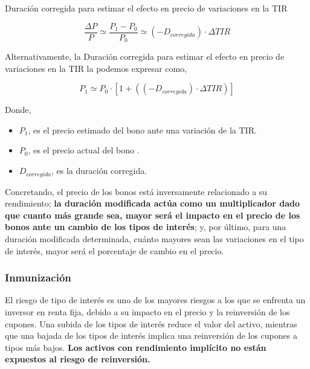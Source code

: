 \documentclass[
  letterpaper,
  DIV=11,
  numbers=noendperiod]{scrartcl}
\begin{document}
\begin{tcolorbox}[enhanced jigsaw, colframe=quarto-callout-note-color-frame, opacityback=0, colback=white, leftrule=.75mm, left=2mm, breakable, arc=.35mm, rightrule=.15mm, toprule=.15mm, bottomrule=.15mm]
\begin{minipage}[t]{5.5mm}
\textcolor{quarto-callout-note-color}{\faInfo}
\end{minipage}%
\begin{minipage}[t]{\textwidth - 5.5mm}

Duración corregida para estimar el efecto en precio de variaciones en la
TIR

\[\frac{\Delta P}{P}\simeq  \frac{P_1-P_0}{P_0}\simeq \left(-D_{corregida}\right)\cdot\Delta TIR\]

Alternativamente, la Duración corregida para estimar el efecto en precio
de variaciones en la TIR la podemos expresar como,

\[P_1\simeq P_0\cdot\left[1+((-D_{corregida})\cdot\Delta TIR)\right]\]

Donde,

\begin{itemize}
\item
  \(P_1\), es el precio estimado del bono ante una variación de la TIR.
\item
  \(P_0\), es el precio actual del bono .
\item
  \(D_{corregida}\), es la duración corregida.
\end{itemize}

\end{minipage}%
\end{tcolorbox}

Concretando, el precio de los bonos está inversamente relacionado a su
rendimiento; \textbf{la duración modificada actúa como un multiplicador
dado que cuanto más grande sea, mayor será el impacto en el precio de
los bonos ante un cambio de los tipos de interés}; y, por último, para
una duración modificada determinada, cuánto mayores sean las variaciones
en el tipo de interés, mayor será el porcentaje de cambio en el precio.

\hypertarget{inmunizaciuxf3n}{%
\subsubsection{Inmunización}\label{inmunizaciuxf3n}}

El riesgo de tipo de interés es uno de los mayores riesgos a los que se
enfrenta un inversor en renta fija, debido a su impacto en el precio y
la reinversión de los cupones. Una subida de los tipos de interés reduce
el valor del activo, mientras que una bajada de los tipos de interés
implica una reinversión de los cupones a tipos más bajos. \textbf{Los
activos con rendimiento implícito no están expuestos al riesgo de
reinversión.}
\end{document}

